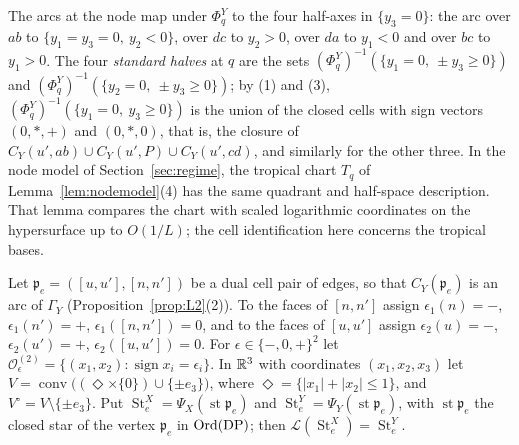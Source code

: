 The arcs at the node map under $\Phi^Y_q$ to the four half-axes in $\{y_3=0\}$: the arc over $ab$ to
$\{y_1=y_3=0,\ y_2<0\}$, over $dc$ to $y_2>0$, over $da$ to $y_1<0$ and over $bc$ to $y_1>0$. The four \emph{standard
halves} at $q$ are the sets $(\Phi^Y_q)^{-1}(\{y_1=0,\ \pm y_3\ge0\})$ and $(\Phi^Y_q)^{-1}(\{y_2=0,\ \pm y_3\ge0\})$; by (1)
and (3), $(\Phi^Y_q)^{-1}(\{y_1=0,\ y_3\ge0\})$ is the union of the closed cells with sign vectors $(0,\ast,+)$ and
$(0,\ast,0)$, that is, the closure of $C_Y(u',ab)\cup C_Y(u',P)\cup C_Y(u',cd)$, and similarly for the other three. In the
node model of Section~\ref{sec:regime}, the tropical chart $T_q$ of Lemma~\ref{lem:nodemodel}(4) has the same
quadrant and half-space description. That lemma compares the chart with scaled logarithmic coordinates on the
hypersurface up to $O(1/L)$; the cell identification here concerns the tropical bases.

Let ${\mathfrak p}_e=([u,u'],[n,n'])$ be a dual cell pair of edges, so that $C_Y({\mathfrak p}_e)$ is an arc of $\Gamma_Y$
(Proposition~\ref{prop:L2}(2)). To the faces of $[n,n']$ assign $\epsilon_1(n)=-$, $\epsilon_1(n')=+$,
$\epsilon_1([n,n'])=0$, and to the faces of $[u,u']$ assign $\epsilon_2(u)=-$, $\epsilon_2(u')=+$, $\epsilon_2([u,u'])=0$.
For $\epsilon\in\{-,0,+\}^2$ let $\mathcal O^{(2)}_\epsilon=\{(x_1,x_2):\operatorname{sign}x_i=\epsilon_i\}$. In $\mathbb R^3$ with
coordinates $(x_1,x_2,x_3)$ let $V=\operatorname{conv}\bigl((\Diamond\times\{0\})\cup\{\pm e_3\}\bigr)$, where
$\Diamond=\{|x_1|+|x_2|\le1\}$, and $V^\circ=V\setminus\{\pm e_3\}$. Put $\operatorname{St}^X_e=\Psi_X(\operatorname{st}{\mathfrak p}_e)$
and $\operatorname{St}^Y_e=\Psi_Y(\operatorname{st}{\mathfrak p}_e)$, with $\operatorname{st}{\mathfrak p}_e$ the closed star of the vertex ${\mathfrak p}_e$ in
$\operatorname{Ord}(\mathrm{DP})$; then $\mathcal L(\operatorname{St}^X_e)=\operatorname{St}^Y_e$.

